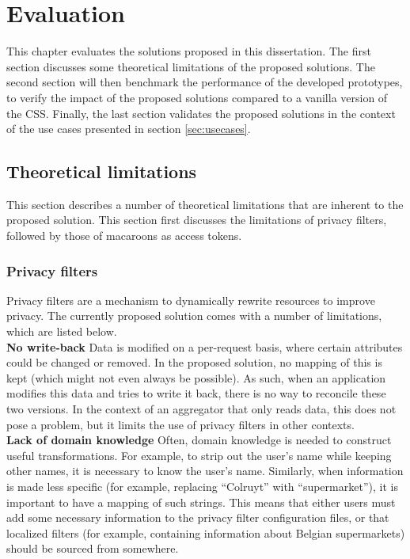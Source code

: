 \chapter{Evaluation}
\label{cha:evaluation}
This chapter evaluates the solutions proposed in this dissertation. The first section discusses some theoretical limitations of the proposed solutions. The second section will then benchmark the performance of the developed prototypes, to verify the impact of the proposed solutions compared to a vanilla version of the \acrlong{CSS}. Finally, the last section validates the proposed solutions in the context of the use cases presented in section \ref{sec:usecases}.

\section{Theoretical limitations}
This section describes a number of theoretical limitations that are inherent to the proposed solution. This section first discusses the limitations of privacy filters, followed by those of macaroons as access tokens.
\label{sec:limitations}
\subsection{Privacy filters}
Privacy filters are a mechanism to dynamically rewrite resources to improve privacy. The currently proposed solution comes with a number of limitations, which are listed below.\\

\noindent \textbf{No write-back} Data is modified on a per-request basis, where certain attributes could be changed or removed. In the proposed solution, no mapping of this is kept (which might not even always be possible). As such, when an application modifies this data and tries to write it back, there is no way to reconcile these two versions. In the context of an aggregator that only reads data, this does not pose a problem, but it limits the use of privacy filters in other contexts.\\

\noindent \textbf{Lack of domain knowledge} Often, domain knowledge is needed to construct useful transformations. For example, to strip out the user's name while keeping other names, it is necessary to know the user's name. Similarly, when information is made less specific (for example, replacing ``Colruyt'' with ``supermarket''), it is important to have a mapping of such strings. This means that either users must add some necessary information to the privacy filter configuration files, or that localized filters (for example, containing information about Belgian supermarkets) should be sourced from somewhere.\\

